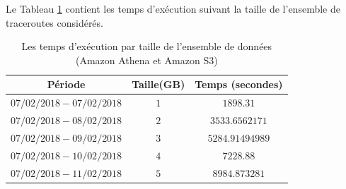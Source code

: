
Le Tableau \ref{tab:athena-data} contient les temps d'exécution suivant la taille de l'ensemble de traceroutes considérés.

\begin{table}[h]
	\centering
	\captionsetup{justification=centering}
\begin{tabular}{c c c}
	\textbf{Période} & \textbf{Taille(GB)} & \textbf{Temps (secondes) } \\ 	\hline 
$ 07/02/2018 - 07/02/2018 $	&$ 1 $&	$ 1898.31 $ \\ 	\hline 
$ 07/02/2018 - 08/02/2018 $	&$ 2 $&	$ 3533.6562171 $ \\ 	\hline 
$ 07/02/2018 - 09/02/2018 $&	$ 3 $&	$ 5284.91494989  $ \\ 	\hline 
$ 07/02/2018 - 10/02/2018 $	&$ 4 $&$ 	7228.88 $  \\ 	\hline 
$ 07/02/2018 - 11/02/2018 $	&$ 5 $& $ 8984.873281	 $ \\ 	\hline 
\end{tabular} 
\caption{Les temps d'exécution par taille de l'ensemble de données (Amazon Athena et Amazon S3)}
\label{tab:athena-data}
\end{table}

